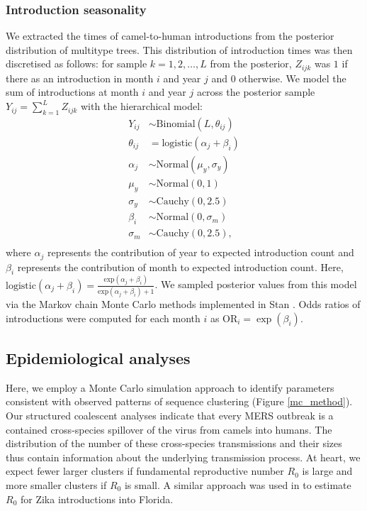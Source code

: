\documentclass[9pt,lineno]{elife}
\begin{document}
\subsubsection*{Introduction seasonality}

We extracted the times of camel-to-human introductions from the posterior distribution of multitype trees.
This distribution of introduction times was then discretised as follows: for sample  $k = 1, 2, \ldots, L$ from the posterior,  $Z_{ijk}$ was $1$ if there as an introduction in month $i$ and year $j$ and $0$ otherwise.
We model the sum of introductions at month $i$ and year $j$ across the posterior sample $Y_{ij} = \sum_{k = 1}^L Z_{ijk}$ with the hierarchical model:
\begin{align*}
  Y_{ij} &\sim \text{Binomial}(L, \theta_{ij}) \\
  \theta_{ij} &= \mathrm{logistic}(\alpha_j + \beta_i) \\
  \alpha_j &\sim \text{Normal}(\mu_{y}, \sigma_{y}) \\
  \mu_{y}  &\sim  \text{Normal}(0, 1) \\
  \sigma_{y} &\sim \text{Cauchy}(0, 2.5) \\
  \beta_i &\sim \text{Normal}(0, \sigma_{m}) \\
  \sigma_{m} &\sim \text{Cauchy}(0, 2.5), \\
\end{align*}
where $\alpha_j$ represents the contribution of year to expected introduction count and $\beta_i$ represents the contribution of month to expected introduction count.
Here, $\mathrm{logistic}(\alpha_j + \beta_i) =  \frac{\mathrm{exp}(\alpha_j + \beta_i)}{\mathrm{exp}(\alpha_j + \beta_i) + 1}$.
We sampled posterior values from this model via the Markov chain Monte Carlo methods implemented in Stan \citep{carpenter_stan_2016}.
Odds ratios of introductions were computed for each month $i$ as $\text{OR}_i = \exp(\beta_i)$.

\subsection*{Epidemiological analyses}

Here, we employ a Monte Carlo simulation approach to identify parameters consistent with observed patterns of sequence clustering (Figure \ref{mc_method}).
Our structured coalescent analyses indicate that every MERS outbreak is a contained cross-species spillover of the virus from camels into humans.
The distribution of the number of these cross-species transmissions and their sizes thus contain information about the underlying transmission process.
At heart, we expect fewer larger clusters if fundamental reproductive number $R_0$ is large and more smaller clusters if $R_0$ is small.
A similar approach was used in \citet{grubaugh_multiple_2017} to estimate $R_0$ for Zika introductions into Florida.
\end{document}

